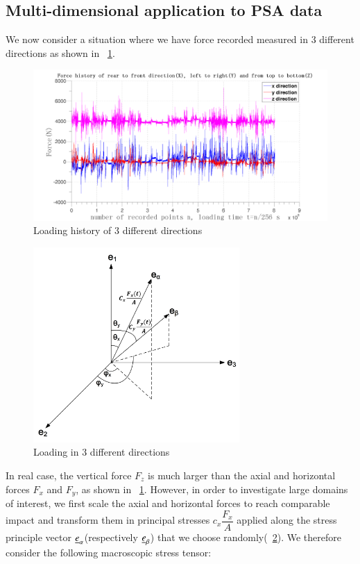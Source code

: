\documentclass[3p,times,number,review]{elsarticle}
\newcommand{\figref}[1]{\figurename~\ref{#1}}
\begin{document}
 \subsection{Multi-dimensional application to PSA data}
 We now consider a situation where we have force recorded measured in 3 different directions as shown in \figref{xyz}.
 \begin{figure}[!h]
 	\centering
 	\includegraphics[width=\textwidth]{figures//xyz.png} 
 	\caption{Loading history of 3 different directions}
 	\label{xyz}
 \end{figure}
  \begin{figure}[!h]
  	\centering
  	\includegraphics[width=0.7\textwidth]{figures//xab.png} 
  	\caption{Loading in 3 different directions}
  	\label{xab}
  \end{figure}
 In real case, the vertical force $F_z$ is much larger than the axial and horizontal forces $F_x$ and $F_y$, as shown in \figref{xyz}. However, in order to investigate large domains of interest, we first scale the axial and horizontal forces to reach comparable impact and transform them in principal stresses $c_x\dfrac{F_x}{A}$ applied along the stress principle vector $\uline{e}_\alpha$(respectively $\uline{e}_\beta$) that we choose randomly(\figref{xab}). We therefore consider the following macroscopic stress tensor:
\end{document}
